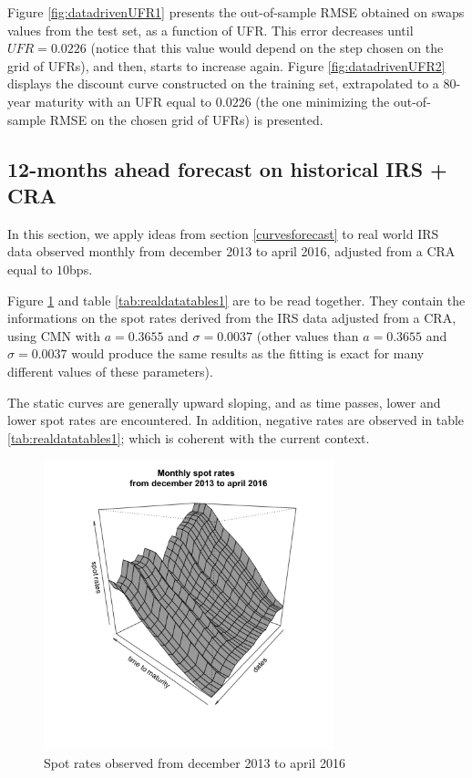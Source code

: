 Figure \ref{fig:datadrivenUFR1} presents the out-of-sample RMSE obtained on swaps values from the  test set, as a function of UFR. This error decreases until $UFR = 0.0226$ (notice that this value would depend on the step chosen on the grid of UFRs), and then, starts to increase again. Figure \ref{fig:datadrivenUFR2} displays the discount curve constructed on the training set, extrapolated to a 80-year maturity with an UFR equal to $0.0226$ (the one minimizing the out-of-sample RMSE on the chosen grid of UFRs) is presented.

\subsection{12-months ahead forecast on historical IRS + CRA}
\label{forecastexample}

In this section, we apply ideas from section \ref{curvesforecast} to real world IRS data observed monthly from december 2013 to april 2016, adjusted from a CRA equal to $10$bps.

\medskip

Figure \ref{fig:forecast1} and table \ref{tab:realdatatables1} are to be read together. They  contain the informations on the spot rates derived from the IRS data adjusted from a CRA, using CMN with $a = 0.3655$ and $\sigma = 0.0037$ (other values than $a = 0.3655$ and $\sigma = 0.0037$ would produce the same results as the fitting is exact for many different values of these parameters).

\medskip

The static curves are generally upward sloping, and as time passes, lower and lower spot rates are encountered. In addition, negative rates are observed in table \ref{tab:realdatatables1}; which is coherent with the current context.

\begin{figure}[!htb]
\centering
  \includegraphics[width=0.75\textwidth]{gfx/chapter-yc-insurance/forecasting_graph1}
\caption{Spot rates observed from december 2013 to april 2016}
\label{fig:forecast1}       %
\end{figure}

